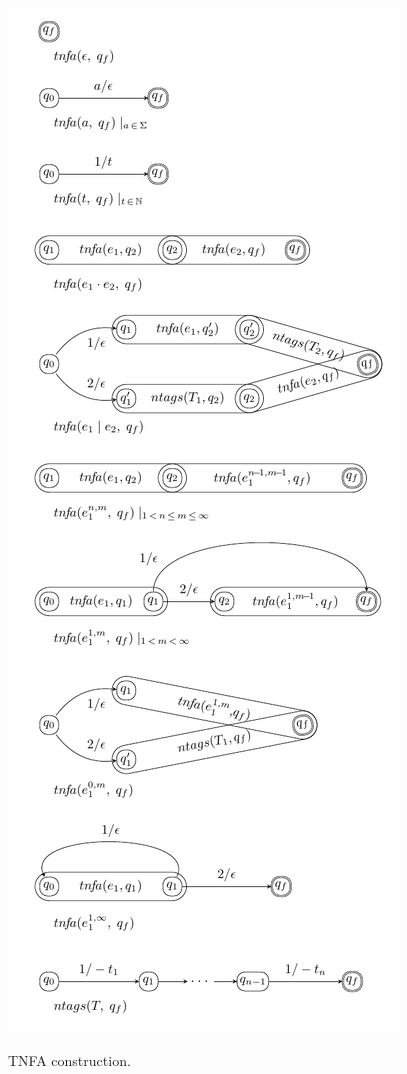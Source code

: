 \documentclass[]{article}
\let\oldnl\nl%
\newcommand{\nonl}{\renewcommand{\nl}{\let\nl\oldnl}}%
\begin{document}
\begin{algorithm}[]
\begin{multicols}{2}
    \nonl \includegraphics[width=\linewidth]{img/tnfa_construction.pdf}

\end{multicols}
\vspace{1em}
\caption{TNFA construction.}\label{alg_tnfa}
\end{algorithm}
\end{document}
